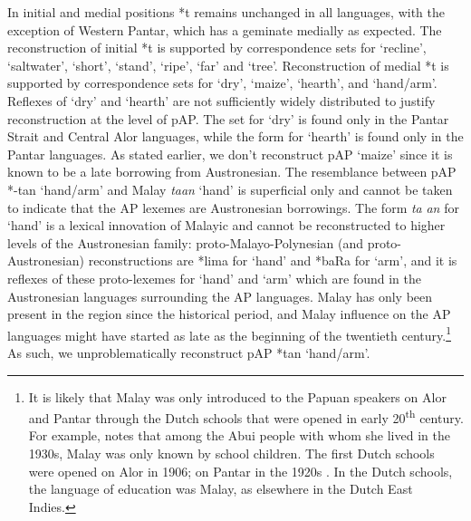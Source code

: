 In initial and medial positions *t remains unchanged in all languages, with the exception of Western Pantar, which has a geminate medially as expected. The reconstruction of initial *t is supported by correspondence sets for `recline', `saltwater', `short', `stand', `ripe', `far' and `tree'. Reconstruction of medial *t is supported by correspondence sets for `dry', `maize', `hearth', and `hand/arm'. Reflexes of `dry' and `hearth' are not sufficiently widely distributed to justify reconstruction at the level of pAP. The set for `dry' is found only in the Pantar Strait and Central Alor languages, while the form for `hearth' is found only in the Pantar languages. As stated earlier, we don't reconstruct pAP `maize' since it is known to be a late borrowing from Austronesian. The resemblance between pAP *-tan `hand/arm' and Malay \textit{ta}\textit{{\ng}}\textit{an} `hand' is superficial only and cannot be taken to indicate that the AP lexemes are Austronesian borrowings. The form \textit{ta}\textit{{\ng}}\textit{
an} for `hand' is a lexical innovation of Malayic and cannot be reconstructed to higher levels of the Austronesian family: proto-Malayo-Polynesian (and proto-Austronesian) reconstructions are *lima for `hand' and *baRa for `arm', and it is reflexes of these proto-lexemes for `hand' and `arm' which are found in the Austronesian languages surrounding the AP languages. Malay has only been present in the region since the historical period, and Malay influence on the AP languages might have started as late as the beginning of the twentieth century.\footnote{ It is likely that Malay was only introduced to the Papuan speakers on Alor and Pantar through the Dutch schools that were opened in early 20\textsuperscript{th} century. For example, \citet[223]{DuBois1944} notes that among the Abui people with whom she lived in the 1930s, Malay was only known by school children. The first Dutch schools were opened on Alor in 1906; on Pantar in the 1920s \citep[14]{Klamer2010grammar}. In the Dutch schools, 
the language of education was Malay, as elsewhere in the Dutch East Indies.} As such, we unproblematically reconstruct pAP *tan `hand/arm'.

